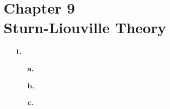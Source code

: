 
\section{Chapter 9\\{\large Sturn-Liouville Theory}}

\begin{enumerate}
	\setlength{\itemsep}{\bigskipamount}
	\item[\textbf{1.}]
		\begin{enumerate}
			\item[\textbf{a.}]


			\item[\textbf{b.}]


			\item[\textbf{c.}]


		\end{enumerate}
\end{enumerate}